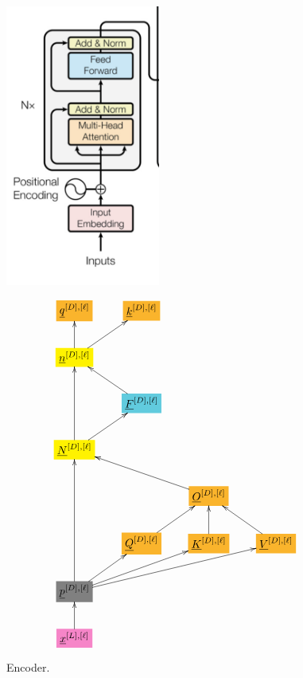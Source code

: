 \documentclass[12pt]{article}
\begin{document}
\begin{figure}[h!]\centering
\begin{minipage}{.5\linewidth}
\includegraphics[width=2in]{encoder.jpg}
\end{minipage}%
\begin{minipage}{.5\linewidth}
$$\xymatrix{
*+[F*:Dandelion]{\underline{q}^{[D], [\ell]}}&*+[F*:Dandelion]{\underline{k}^{[D], [\ell]}}&&
\\
*+[F*:yellow]{\underline{n}^{[D], [\ell]}}\ar[ur]\ar[u]&&&
\\
&*+[F*:SkyBlue]{\underline{F}^{[D], [\ell]}}\ar[ul]&&
\\
*+[F*:yellow]{\underline{N}^{[D], [\ell]}}\ar[ur]\ar[uu]&&&
\\
&&*+[F*:Dandelion]{\underline{O}^{[D], [\ell]}}\ar[ull]&
\\
&*+[F*:Dandelion]{\underline{Q}^{[D], [\ell]}}\ar[ur]&*+[F*:Dandelion]{\underline{K}^{[D], [\ell]}}\ar[u]&*+[F*:Dandelion]{\underline{V}^{[D],[\ell]}}\ar[ul]
\\
*+[F*:gray]{\underline{p}^{[D], [\ell]}}\ar[urr]\ar[uuu]\ar[ur]\ar[urrr]&&&
\\
*+[F*:Lavender]{\underline{x}^{[L],[\ell]}}\ar[u]&&&
}$$
\end{minipage}
\caption{Encoder.}
\label{fig-texnn-for-encoder}
\end{figure}
\end{document}

